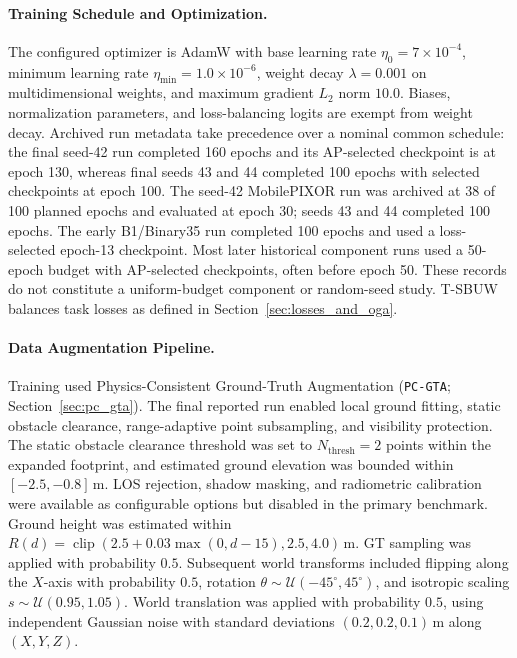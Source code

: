 \paragraph{Training Schedule and Optimization.}
The configured optimizer is AdamW with base learning rate $\eta_0 = 7 \times 10^{-4}$, minimum learning rate $\eta_{\min} = 1.0 \times 10^{-6}$, weight decay $\lambda = 0.001$ on multidimensional weights, and maximum gradient $L_2$ norm $10.0$. Biases, normalization parameters, and loss-balancing logits are exempt from weight decay. Archived run metadata take precedence over a nominal common schedule: the final seed-42 run completed 160 epochs and its AP-selected checkpoint is at epoch 130, whereas final seeds 43 and 44 completed 100 epochs with selected checkpoints at epoch 100. The seed-42 MobilePIXOR run was archived at 38 of 100 planned epochs and evaluated at epoch 30; seeds 43 and 44 completed 100 epochs. The early B1/Binary35 run completed 100 epochs and used a loss-selected epoch-13 checkpoint. Most later historical component runs used a 50-epoch budget with AP-selected checkpoints, often before epoch 50. These records do not constitute a uniform-budget component or random-seed study. T-SBUW balances task losses as defined in Section~\ref{sec:losses_and_oga}.

\paragraph{Data Augmentation Pipeline.}
Training used Physics-Consistent Ground-Truth Augmentation (\texttt{PC-GTA}; Section~\ref{sec:pc_gta}). The final reported run enabled local ground fitting, static obstacle clearance, range-adaptive point subsampling, and visibility protection. The static obstacle clearance threshold was set to $N_{\mathrm{thresh}} = 2$ points within the expanded footprint, and estimated ground elevation was bounded within $[-2.5, -0.8]\,\text{m}$. LOS rejection, shadow masking, and radiometric calibration were available as configurable options but disabled in the primary benchmark. Ground height was estimated within $R(d) = \operatorname{clip}(2.5 + 0.03\max(0, d - 15), 2.5, 4.0)\,\text{m}$. GT sampling was applied with probability $0.5$. Subsequent world transforms included flipping along the $X$-axis with probability $0.5$, rotation $\theta \sim \mathcal{U}(-45^\circ,45^\circ)$, and isotropic scaling $s \sim \mathcal{U}(0.95,1.05)$. World translation was applied with probability $0.5$, using independent Gaussian noise with standard deviations $(0.2,0.2,0.1)\,\text{m}$ along $(X,Y,Z)$.

